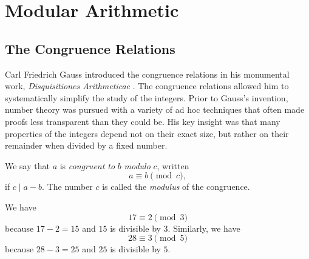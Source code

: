 \chapter{Modular Arithmetic}\label{chapter:congruences}

\section{The Congruence Relations}

Carl Friedrich Gauss introduced the congruence relations in his monumental work, \emph{Disquisitiones Arithmeticae} \cite{gauss1986}. The congruence relations allowed him to systematically simplify the study of the integers. Prior to Gauss's invention, number theory was pursued with a variety of ad hoc techniques that often made proofs less transparent than they could be. His key insight was that many properties of the integers depend not on their exact size, but rather on their remainder when divided by a fixed number.

\begin{definition}
  We say that $a$ is \emph{congruent to} $b$ \emph{modulo} $c$, written
  \begin{equation*}
    a \equiv b \pmod{c},
  \end{equation*}
  if $c\mid a-b$. The number $c$ is called the \emph{modulus} of the congruence.
\end{definition}

\begin{example}
  We have
  \begin{equation*}
    17 \equiv 2 \pmod{3}
  \end{equation*}
  because $17-2=15$ and $15$ is divisible by $3$. Similarly, we have
  \begin{equation*}
    28 \equiv 3 \pmod{5}
  \end{equation*}
  because $28-3=25$ and $25$ is divisible by $5$.
\end{example}

